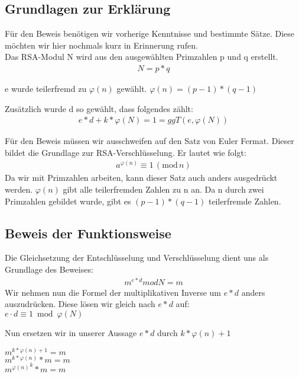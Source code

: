 \subsection{Grundlagen zur Erklärung}
Für den Beweis benötigen wir vorherige Kenntnisse und bestimmte Sätze. Diese möchten wir hier nochmals kurz in Erinnerung rufen.\\ 
Das RSA-Modul N wird aus den ausgewählten Primzahlen p und q erstellt.
\begin{align}
  N = p * q
\end{align}

e wurde teilerfremd zu $ \varphi(n) $ gewählt. 
$ \varphi(n) = (p-1)*(q-1) $

Zusätzlich wurde d so gewählt, dass folgendes zählt:
\begin{align}
 e * d + k * \varphi(N) = 1 = ggT(e,\varphi(N))
\end{align}

Für den Beweis müssen wir ausschweifen auf den Satz von Euler Fermat. Dieser bildet die Grundlage zur RSA-Verschlüsselung. Er lautet wie folgt:
\begin{align}
	a^{\varphi(n)} \equiv 1\,(\mathrm{mod}\,n)
\end{align}
Da wir mit Primzahlen arbeiten, kann dieser Satz auch anders ausgedrückt werden. $ \varphi(n) $ gibt alle teilerfremden Zahlen zu n an. Da n durch zwei Primzahlen gebildet wurde, gibt es $ (p-1)*(q-1) $ teilerfremde Zahlen. 

\subsection{Beweis der Funktionsweise}
Die Gleichsetzung der Entschlüsselung und Verschlüsselung dient uns als Grundlage des Beweises:
\begin{align}   
 m^{e*d} mod N = m
\end{align}
%
Wir nehmen nun die Formel der multiplikativen Inverse um $ e*d $ anders auszudrücken. Diese lösen wir gleich nach $ e*d $ auf:\\
$ e \cdot d \equiv 1 \bmod{\varphi(N)} $

Nun ersetzen wir in unserer Aussage $ e*d $ durch $ k* \varphi(n)+1 $
\begin{center}
$ m^{ k* \varphi(n) +1} = m $ \\
$ m^{k* \varphi(n)} * m = m $ \\
$ { m^{ \varphi(n) }} ^k * m = m $ \\
\end{center}

